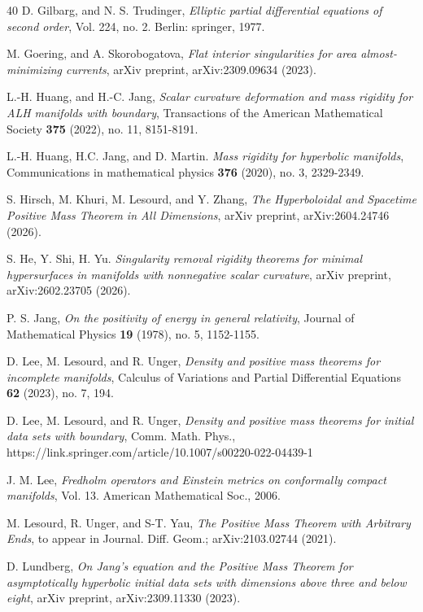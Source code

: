 \documentclass[11pt]{amsart}
\theoremstyle{remark}
\numberwithin{equation}{section}
\begin{document}
{{\begin{thebibliography}{40}
D. Gilbarg, and N. S. Trudinger, {\em Elliptic partial differential equations of second order}, Vol. 224, no. 2. Berlin: springer, 1977. 

M. Goering, and A. Skorobogatova, {\em Flat interior singularities for area almost-minimizing currents}, arXiv preprint, arXiv:2309.09634 (2023).

L.-H. Huang, and H.-C. Jang, {\em Scalar curvature deformation and mass rigidity for ALH manifolds with boundary}, Transactions of the American Mathematical Society \textbf{375} (2022), no. 11, 8151-8191.

 L.-H. Huang, H.C. Jang, and D. Martin. {\em Mass rigidity for hyperbolic manifolds}, Communications in mathematical physics \textbf{376} (2020), no. 3, 2329-2349. 

 S. Hirsch, M. Khuri, M. Lesourd, and Y. Zhang, {\em The Hyperboloidal and Spacetime Positive Mass Theorem in All Dimensions}, arXiv preprint, arXiv:2604.24746 (2026). 

 S. He, Y. Shi, H. Yu. {\em Singularity removal rigidity theorems for minimal hypersurfaces in manifolds with nonnegative scalar curvature}, arXiv preprint, arXiv:2602.23705 (2026). 

 P. S. Jang, {\em On the positivity of energy in general relativity}, Journal of Mathematical Physics \textbf{19} (1978), no. 5, 1152-1155.

 D. Lee, M. Lesourd, and R. Unger, {\em Density and positive mass theorems for incomplete manifolds}, Calculus of Variations and Partial Differential Equations \textbf{62} (2023), no. 7, 194. 

 D. Lee, M. Lesourd, and R. Unger, {\em Density and positive mass theorems for initial data sets with boundary}, Comm. Math. Phys., https://link.springer.com/article/10.1007/s00220-022-04439-1

J. M. Lee, {\em Fredholm operators and Einstein metrics on conformally compact manifolds}, Vol. 13. American Mathematical Soc., 2006.

 M. Lesourd, R. Unger, and S-T. Yau,  {\em The Positive Mass Theorem with Arbitrary Ends},  to appear in Journal. Diff. Geom.; arXiv:2103.02744 (2021). 

D. Lundberg, {\em On Jang's equation and the Positive Mass Theorem for asymptotically hyperbolic initial data sets with dimensions above three and below eight}, arXiv preprint, arXiv:2309.11330 (2023).


\end{thebibliography}}}
\end{document}
